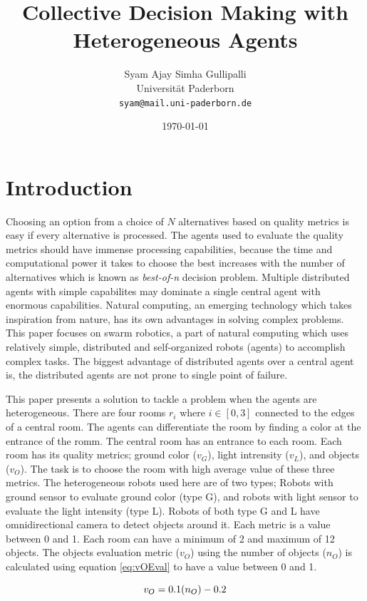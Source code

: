 \documentclass{llncs}
\title{Collective Decision Making with Heterogeneous Agents}
\author{Syam Ajay Simha Gullipalli\\
		Universit\"at Paderborn\\
		\texttt{syam@mail.uni-paderborn.de}}
\date{\today}
\begin{document}
	\maketitle
	\thispagestyle{fancy}
	
	\section{Introduction}
	Choosing an option from a choice of $N$ alternatives based on quality metrics is easy if every alternative is processed. The agents used to evaluate the quality metrics should have immense processing capabilities, because the time and computational power it takes to choose the best increases with the number of alternatives which is known as \textit{best-of-n} decision problem. Multiple distributed agents with simple capabilites may dominate a single central agent with enormous capabilities. Natural computing, an emerging technology which takes inspiration from nature, has its own advantages in solving complex problems. This paper focuses on swarm robotics, a part of natural computing which uses relatively simple, distributed and self-organized robots (agents) to accomplish complex tasks. The biggest advantage of distributed agents over a central agent is, the distributed agents are not prone to single point of failure.
	
	This paper presents a solution to tackle a problem when the agents are heterogeneous. There are four rooms $r_i$ where $i \in [0,3]$ connected to the edges of a central room. The agents can differentiate the room by finding a color at the entrance of the romm. The central room has an entrance to each room. Each room has its quality metrics; ground color ($v_G$), light intrensity ($v_L$), and objects ($v_O$). The task is to choose the room with high average value of these three metrics. The heterogeneous robots used here are of two types; Robots with ground sensor to evaluate ground color (type G), and robots with light sensor to evaluate the light intensity (type L). Robots of both type G and L have omnidirectional camera to detect objects around it. Each metric is a value between 0 and 1. Each room can have a minimum of 2 and maximum of 12 objects. The objects evaluation metric ($v_O$) using the number of objects ($n_O$) is calculated using equation \eqref{eq:vOEval} to have a value between 0 and 1.
	
	\begin{equation}
		\centering
		v_O = 0.1(n_O) - 0.2
		\label{eq:vOEval}
	\end{equation}
	
\end{document}
